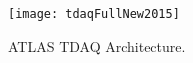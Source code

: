 \begin{figure}[tbp] %
\centering
\texttt{[image: tdaqFullNew2015]}
\caption{ATLAS TDAQ Architecture.}
\label{fig:atlas_tdaq}
\end{figure}



